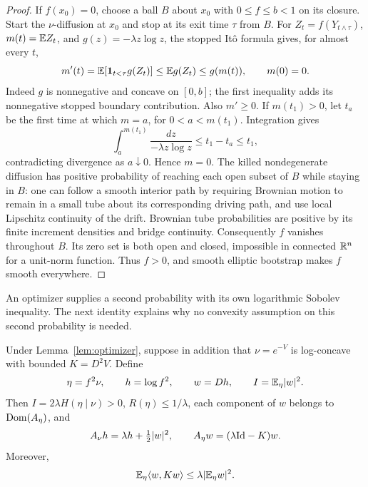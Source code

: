 \begin{proof}
If $f(x_0)=0$, choose a ball $B$ about $x_0$ with
$0\le f\le b<1$ on its closure. Start the $\nu$-diffusion at
$x_0$ and stop at its exit time $\tau$ from $B$. For
$Z_t=f(Y_{t\wedge\tau})$, $m(t)=\mathbb E Z_t$, and
$g(z)=-\lambda z\log z$, the stopped It\^o formula gives, for almost
every $t$,
\[
 m'(t)=\mathbb E[\mathbf 1_{t<\tau}g(Z_t)]\le\mathbb E g(Z_t)\le g(m(t)),
 \qquad m(0)=0.
\]
Indeed $g$ is nonnegative and concave on $[0,b]$; the first
inequality adds its nonnegative stopped boundary contribution.
Also $m'\ge0$. If $m(t_1)>0$, let $t_a$ be the first time at
which $m=a$, for $0<a<m(t_1)$. Integration gives
\[
 \int_a^{m(t_1)}\frac{dz}{-\lambda z\log z}
 \le t_1-t_a\le t_1,
\]
contradicting divergence as $a\downarrow0$. Hence $m=0$.
The killed nondegenerate diffusion has positive probability of
reaching each open subset of $B$ while staying in $B$: one can
follow a smooth interior path by requiring Brownian motion to
remain in a small tube about its corresponding driving path,
and use local Lipschitz continuity of the drift. Brownian tube
probabilities are positive by its finite increment densities and
bridge continuity. Consequently $f$ vanishes throughout $B$.
Its zero set is both open and closed, impossible in connected
$\mathbb R^n$ for a unit-norm function. Thus $f>0$, and smooth elliptic
bootstrap makes $f$ smooth everywhere.
\end{proof}

An optimizer supplies a second probability with its own logarithmic
Sobolev inequality. The next identity explains why no convexity
assumption on this second probability is needed.

\begin{samepage}
\begin{lemma}
\label{lem:critical-change-reference}
Under Lemma~\ref{lem:optimizer}, suppose in addition that
$\nu=e^{-V}$ is log-concave with bounded $K=D^2V$.
Define
\[
 \eta=f^2\nu,\qquad h=\log f^2,\qquad w=Dh,\qquad
 I=\mathbb E_\eta|w|^2.
\]
Then $I=2\lambda H(\eta\mid\nu)>0$, $R(\eta)\le1/\lambda$,
each component of $w$ belongs to $\operatorname{Dom}(A_\eta)$, and
\begin{equation}\label{eq:critical-score-equation}
 A_\nu h=\lambda h+\tfrac12|w|^2,
 \qquad A_\eta w=(\lambda\mathrm{Id}-K)w.
\end{equation}
Moreover,
\begin{equation}\label{eq:critical-curvature-mean}
 \mathbb E_\eta\langle w,Kw\rangle\le\lambda|\mathbb E_\eta w|^2.
\end{equation}
\end{lemma}
\end{samepage}

